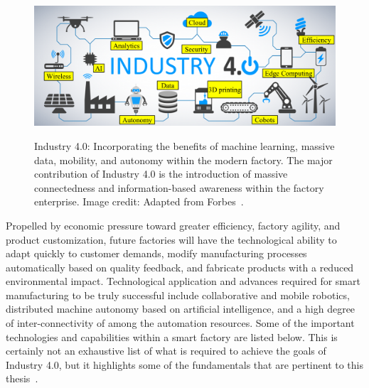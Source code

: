 \begin{figure}[!tbp]
	\begin{center}
		\includegraphics[width=\textwidth]{chapter-intro/images/intro/forbes-i40-candell.png}
		\label{fig:intro:forbes-i40}
		\caption{Industry 4.0: Incorporating the benefits of machine learning, massive data, mobility, and autonomy within the modern factory.  The major contribution of Industry 4.0 is the introduction of massive connectedness and information-based awareness within the factory enterprise. Image credit: Adapted from Forbes~\cite{Forbes-I40}.}
	\end{center}
\end{figure}

Propelled by economic pressure toward greater efficiency, factory agility, and product customization, future factories will have the technological ability to adapt quickly to customer demands, modify manufacturing processes automatically based on quality feedback, and fabricate products with a reduced environmental impact.  Technological application and advances required for smart manufacturing to be truly successful include collaborative and mobile robotics, distributed machine autonomy based on artificial intelligence, and a high degree of inter-connectivity of among the automation resources.  Some of the important technologies and capabilities within a smart factory are listed below.  This is certainly not an exhaustive list of what is required to achieve the goals of Industry 4.0, but it highlights some of the fundamentals that are pertinent to this thesis~\cite{Mueller2017, Zheng2018, Liu2019, Cheng2018}.

